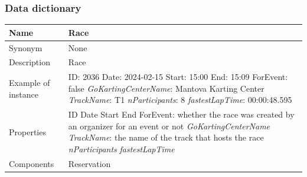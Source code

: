 \documentclass{beamer}
\begin{document}
\begin{frame}
\frametitle{Data dictionary}
\begin{table}
\tiny
\begin{tabular}{|p{2cm}|p{6cm}|}
\hline
Name & \textbf{Race} \\
\hline
Synonym & None \\
\hline
Description & Race \\
\hline
Example of instance &
ID: 2036 \newline
Date: 2024-02-15 \newline
Start: 15:00 \newline
End: 15:09 \newline
ForEvent: false \newline
\textit{GoKartingCenterName}: Mantova Karting Center \newline
\textit{TrackName}: T1 \newline
\textit{nParticipants}: 8 \newline
\textit{fastestLapTime}: 00:00:48.595 \\
\hline
Properties &
ID \newline
Date \newline
Start \newline
End \newline
ForEvent: whether the race was created by an organizer for an event or not \newline
\textit{GoKartingCenterName} \newline
\textit{TrackName}: the name of the track that hosts the race \newline
\textit{nParticipants} \newline
\textit{fastestLapTime} \\
\hline
Components & Reservation \\
\hline
\end{tabular}
\end{table}
\end{frame}
\end{document}

